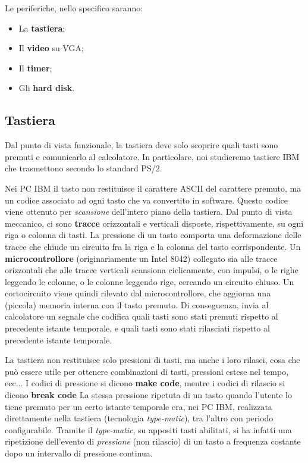 \documentclass[a4paper,11pt]{article}
\begin{document}
Le periferiche, nello specifico saranno:
\begin{itemize}
	\item La \textbf{tastiera};
	\item Il \textbf{video} su VGA;
	\item Il \textbf{timer};
	\item Gli \textbf{hard disk}.
\end{itemize}

\subsection{Tastiera}
Dal punto di vista funzionale, la tastiera deve solo scoprire quali tasti sono premuti e comunicarlo al calcolatore.
In particolare, noi studieremo tastiere IBM che trasmettono secondo lo standard PS/2.

Nei PC IBM il tasto non restituisce il carattere ASCII del carattere premuto, ma un codice associato ad ogni tasto che va convertito in software.
Questo codice viene ottenuto per \textit{scansione} dell'intero piano della tastiera.
Dal punto di vista meccanico, ci sono \textbf{tracce} orizzontali e verticali disposte, rispettivamente, su ogni riga o colonna di tasti.
La pressione di un tasto comporta una deformazione delle tracce che chiude un circuito fra la riga e la colonna del tasto corrispondente.
Un \textbf{microcontrollore} (originariamente un Intel 8042) collegato sia alle tracce orizzontali che alle tracce verticali scansiona ciclicamente, con impulsi, o le righe leggendo le colonne, o le colonne leggendo rige, cercando un circuito chiuso.
Un cortocircuito viene quindi rilevato dal microcontrollore, che aggiorna una (piccola) memoria interna con il tasto premuto.
Di conseguenza, invia al calcolatore un segnale che codifica quali tasti sono stati premuti rispetto al precedente istante temporale, e quali tasti sono stati rilasciati rispetto al precedente istante temporale. 

La tastiera non restituisce solo pressioni di tasti, ma anche i loro rilasci, cosa che può essere utile per ottenere combinazioni di tasti, pressioni estese nel tempo, ecc...
I codici di pressione si dicono \textbf{make code}, mentre i codici di rilascio si dicono \textbf{break code} 
La stessa pressione ripetuta di un tasto quando l'utente lo tiene premuto per un certo istante temporale era, nei PC IBM, realizzata direttamente nella tastiera (tecnologia \textit{type-matic}), tra l'altro con periodo configurabile.
Tramite il \textit{type-matic}, su appositi tasti abilitati, si ha infatti una ripetizione dell'evento di \textit{pressione} (non rilascio) di un tasto a frequenza costante dopo un intervallo di pressione continua.
\end{document}
